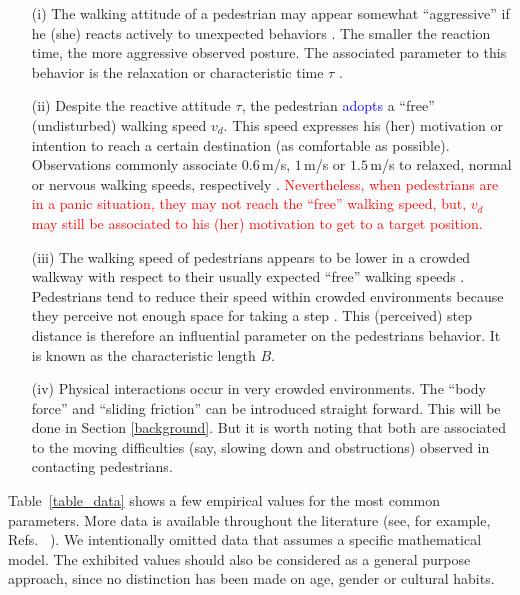 \documentclass[preprint,12pt]{elsarticle}
\begin{document}
\begin{itemize}
\item[(i)] The walking attitude of a pedestrian may appear somewhat 
  ``aggressive'' if he (she) reacts actively to unexpected behaviors 
\cite{lakoba_2005,helbing_1995}. The smaller the reaction time, the more 
 aggressive observed posture. The associated parameter to this 
behavior is the relaxation or characteristic time $\tau$ 
\cite{johansson_2009,helbing_2000}. 

\item[(ii)] Despite the reactive attitude $\tau$, the pedestrian \textcolor{blue}{adopts} a 
``free'' (undisturbed) walking speed $v_d$. This speed expresses his (her) 
motivation or intention to reach a certain destination (as comfortable as 
possible). Observations commonly associate $0.6\,$m/s, $1\,$m/s or $1.5\,$m/s 
to relaxed, normal or nervous walking speeds, respectively  
\cite{helbing_1995,helbing_2000,li_2015}. 
\textcolor{red}{Nevertheless, when pedestrians are in a panic situation,
 they may not reach the ``free'' walking speed, but, $v_d$ may still be 
 associated to his (her) motivation to get to a target position.  }

\item[(iii)] The walking speed of pedestrians appears to be lower in a 
crowded walkway with respect to their usually expected ``free'' walking speeds 
\cite{weidmann_1992,lakoba_2005}. Pedestrians tend to reduce their speed within 
crowded environments because they perceive not enough space for taking a 
step  \cite{johansson_2009}. This (perceived) step distance 
is therefore an influential parameter on the pedestrians behavior. 
It is known as the characteristic length $B$.

\item[(iv)] Physical interactions occur in very crowded environments. The 
``body force''  and ``sliding friction'' can be introduced straight forward. 
This will be done in Section \ref{background}. But it is worth noting that 
both are associated to the moving difficulties (say, slowing down and 
obstructions) observed in contacting pedestrians. 

\end{itemize}


Table~\ref{table_data} shows a few empirical values
 for the most common 
parameters. More data is available throughout the literature (see, for example, 
Refs.~\cite{hoogendoorn_2007,seyfried_2007,johansson_2007,moussaid_2009,
luber_2010,seer_2014,li_2015} ). We intentionally omitted data that assumes a 
specific mathematical model. The exhibited values should also be considered as a 
general purpose approach, since no distinction has been made on age, gender or 
cultural habits. \\
\end{document}

